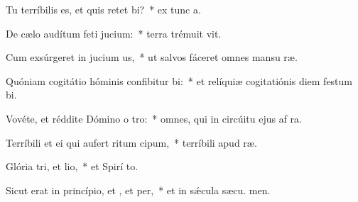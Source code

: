 \item Tu terríbilis es, et quis retet bi?~* ex tunc  a.
\item De cælo audítum feti jucium:~* terra trémuit  vit.
\item Cum exsúrgeret in jucium us,~* ut salvos fáceret omnes mansu ræ.
\item Quóniam cogitátio hóminis confibitur bi:~* et relíquiæ cogitatiónis diem festum  bi.
\item Vovéte, et réddite Dómino o tro:~* omnes, qui in circúitu ejus af ra.
\item Terríbili et ei qui aufert ritum cipum,~* terríbili apud  ræ.
\item Glória tri, et lio,~* et Spirí to.
\item Sicut erat in princípio, et , et per,~* et in sǽcula sæcu. men.

